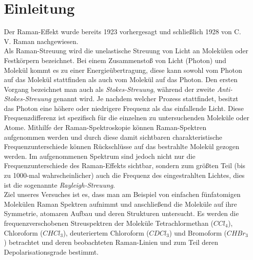 \chapter{Einleitung}
Der Raman-Effekt wurde bereits 1923 vorhergesagt und schließlich 1928 von  
C. V. Raman nachgewiesen. \\
Als Raman-Streuung wird die unelastische Streuung von Licht an Molekülen oder 
Festkörpern bezeichnet.
Bei einem Zusammenstoß von Licht (Photon) und Molekül kommt es zu einer Energieübertragung, diese 
kann sowohl vom Photon auf das Molekül stattfinden als auch vom Molekül 
auf das Photon. Den ersten Vorgang bezeichnet man auch als \textit{Stokes-Streuung},
während der zweite \textit{Anti-Stokes-Streuung} genannt wird. 
Je nachdem welcher Prozess stattfindet, besitzt das Photon eine höhere oder 
niedrigere Frequenz als das einfallende Licht. 
Diese Frequenzdifferenz ist spezifisch für die einzelnen zu untersuchenden Moleküle oder Atome.
Mithilfe der Raman-Spektroskopie können Raman-Spektren aufgenommen werden 
und durch diese damit sichtbaren charakteristische Frequenzunterschiede können Rückschlüsse auf das 
bestrahlte Molekül gezogen werden. 
Im aufgenommenen Spektrum sind jedoch nicht nur die Frequenzunterschiede des Raman-Effekts
sichtbar, sondern zum größten Teil (bis zu 1000-mal wahrscheinlicher) 
auch die Frequenz des eingestrahlten Lichtes, dies ist die sogenannte 
\textit{Rayleigh-Streuung}. \\

Ziel unseres Versuches ist es, dass man am Beispiel von einfachen fünfatomigen 
Molekülen Raman Spektren aufnimmt und anschließend die Moleküle auf 
ihre Symmetrie, atomaren Aufbau und deren Strukturen untersucht. 
Es werden die frequenzverschobenen Streuspektren der Moleküle 
Tetrachlormethan ($CCl_4$), Chloroform ($CHCl_3$), deuteriertem Chloroform ($CDCl_3$) 
und Bromoform ($CHBr_3$) betrachtet und deren beobachteten Raman-Linien und zum Teil 
deren Depolarisationsgrade bestimmt. 
